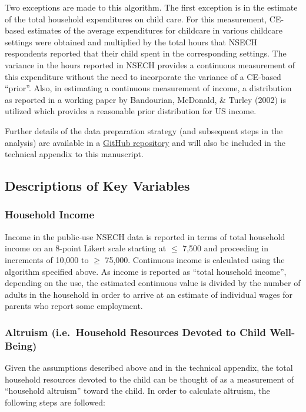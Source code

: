 \documentclass[]{elsarticle}
\begin{document}
Two exceptions are made to this algorithm. The first exception is in the
estimate of the total household expenditures on child care. For this
measurement, CE-based estimates of the average expenditures for
childcare in various childcare settings were obtained and multiplied by
the total hours that NSECH respondents reported that their child spent
in the corresponding settings. The variance in the hours reported in
NSECH provides a continuous measurement of this expenditure without the
need to incorporate the variance of a CE-based ``prior''. Also, in
estimating a continuous measurement of income, a distribution as
reported in a working paper by Bandourian, McDonald, \& Turley (2002) is
utilized which provides a reasonable prior distribution for US income.

Further details of the data preparation strategy (and subsequent steps
in the analysis) are available in a
\href{https://github.com/mienkoja/qualpaper}{GitHub repository} and will
also be included in the technical appendix to this manuscript.

\subsection{Descriptions of Key
Variables}\label{descriptions-of-key-variables}

\subsubsection{Household Income}\label{household-income}

Income in the public-use NSECH data is reported in terms of total
household income on an 8-point Likert scale starting at $\le$ 7,500 and
proceeding in increments of 10,000 to $\ge$ 75,000. Continuous income is
calculated using the algorithm specified above. As income is reported as
``total household income'', depending on the use, the estimated
continuous value is divided by the number of adults in the household in
order to arrive at an estimate of individual wages for parents who
report some employment.

\subsubsection{Altruism (i.e.~Household Resources Devoted to Child
Well-Being)}\label{altruism-i.e.household-resources-devoted-to-child-well-being}

Given the assumptions described above and in the technical appendix, the
total household resources devoted to the child can be thought of as a
measurement of ``household altruism'' toward the child. In order to
calculate altruism, the following steps are followed:
\end{document}
